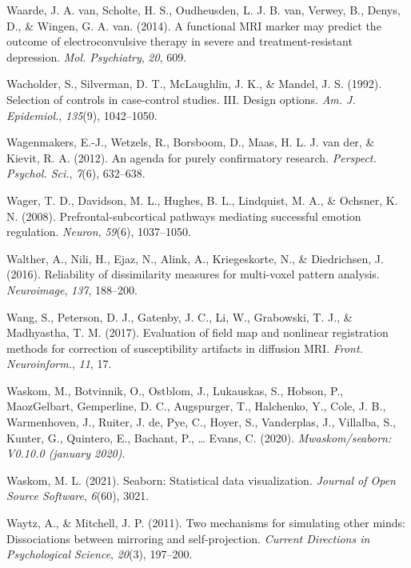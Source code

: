 \documentclass[12pt,american,a4paper,oneside,]{memoir} %
\begin{document}
\leavevmode\hypertarget{ref-Van_Waarde2014-sh}{}%
Waarde, J. A. van, Scholte, H. S., Oudheusden, L. J. B. van, Verwey, B., Denys, D., \& Wingen, G. A. van. (2014). A functional MRI marker may predict the outcome of electroconvulsive therapy in severe and treatment-resistant depression. \emph{Mol. Psychiatry}, \emph{20}, 609.

\leavevmode\hypertarget{ref-Wacholder1992-wb}{}%
Wacholder, S., Silverman, D. T., McLaughlin, J. K., \& Mandel, J. S. (1992). Selection of controls in case-control studies. III. Design options. \emph{Am. J. Epidemiol.}, \emph{135}(9), 1042--1050.

\leavevmode\hypertarget{ref-Wagenmakers2012-vd}{}%
Wagenmakers, E.-J., Wetzels, R., Borsboom, D., Maas, H. L. J. van der, \& Kievit, R. A. (2012). An agenda for purely confirmatory research. \emph{Perspect. Psychol. Sci.}, \emph{7}(6), 632--638.

\leavevmode\hypertarget{ref-wager2008prefrontal}{}%
Wager, T. D., Davidson, M. L., Hughes, B. L., Lindquist, M. A., \& Ochsner, K. N. (2008). Prefrontal-subcortical pathways mediating successful emotion regulation. \emph{Neuron}, \emph{59}(6), 1037--1050.

\leavevmode\hypertarget{ref-Walther2016-je}{}%
Walther, A., Nili, H., Ejaz, N., Alink, A., Kriegeskorte, N., \& Diedrichsen, J. (2016). Reliability of dissimilarity measures for multi-voxel pattern analysis. \emph{Neuroimage}, \emph{137}, 188--200.

\leavevmode\hypertarget{ref-Wang2017-nk}{}%
Wang, S., Peterson, D. J., Gatenby, J. C., Li, W., Grabowski, T. J., \& Madhyastha, T. M. (2017). Evaluation of field map and nonlinear registration methods for correction of susceptibility artifacts in diffusion MRI. \emph{Front. Neuroinform.}, \emph{11}, 17.

\leavevmode\hypertarget{ref-Waskom2020-qq}{}%
Waskom, M., Botvinnik, O., Ostblom, J., Lukauskas, S., Hobson, P., MaozGelbart, Gemperline, D. C., Augspurger, T., Halchenko, Y., Cole, J. B., Warmenhoven, J., Ruiter, J. de, Pye, C., Hoyer, S., Vanderplas, J., Villalba, S., Kunter, G., Quintero, E., Bachant, P., \ldots{} Evans, C. (2020). \emph{Mwaskom/seaborn: V0.10.0 (january 2020)}.

\leavevmode\hypertarget{ref-waskom2021seaborn}{}%
Waskom, M. L. (2021). Seaborn: Statistical data visualization. \emph{Journal of Open Source Software}, \emph{6}(60), 3021.

\leavevmode\hypertarget{ref-waytz2011two}{}%
Waytz, A., \& Mitchell, J. P. (2011). Two mechanisms for simulating other minds: Dissociations between mirroring and self-projection. \emph{Current Directions in Psychological Science}, \emph{20}(3), 197--200.
\end{document}
